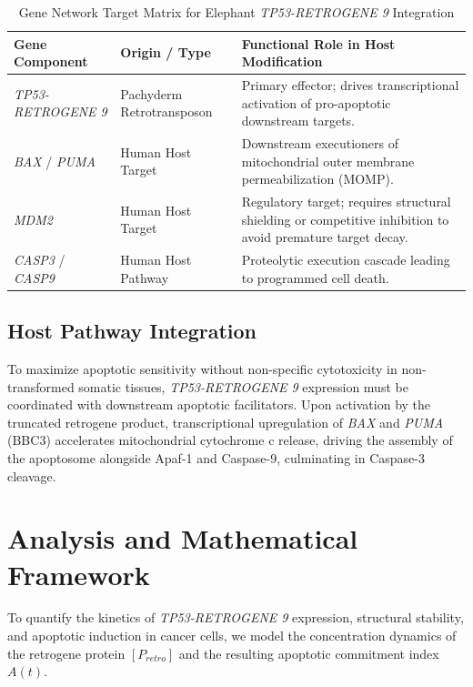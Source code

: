 \documentclass[12pt]{article}
\begin{document}
\begin{table}[h!]
\centering
\caption{Gene Network Target Matrix for Elephant \textit{TP53-RETROGENE 9} Integration}
\vspace{0.2cm}
\begin{tabular}{|l|l|p{6cm}|}
\hline
\textbf{Gene Component} & \textbf{Origin / Type} & \textbf{Functional Role in Host Modification} \\ \hline
\textit{TP53-RETROGENE 9} & Pachyderm Retrotransposon & Primary effector; drives transcriptional activation of pro-apoptotic downstream targets. \\ \hline
\textit{BAX} / \textit{PUMA} & Human Host Target & Downstream executioners of mitochondrial outer membrane permeabilization (MOMP). \\ \hline
\textit{MDM2} & Human Host Target & Regulatory target; requires structural shielding or competitive inhibition to avoid premature target decay. \\ \hline
\textit{CASP3} / \textit{CASP9} & Human Host Pathway & Proteolytic execution cascade leading to programmed cell death. \\ \hline
\end{tabular}
\end{table}

\subsection{Host Pathway Integration}

To maximize apoptotic sensitivity without non-specific cytotoxicity in non-transformed somatic tissues, \textit{TP53-RETROGENE 9} expression must be coordinated with downstream apoptotic facilitators. Upon activation by the truncated retrogene product, transcriptional upregulation of \textit{BAX} and \textit{PUMA} (BBC3) accelerates mitochondrial cytochrome c release, driving the assembly of the apoptosome alongside Apaf-1 and Caspase-9, culminating in Caspase-3 cleavage.

\section{Analysis and Mathematical Framework}

To quantify the kinetics of \textit{TP53-RETROGENE 9} expression, structural stability, and apoptotic induction in cancer cells, we model the concentration dynamics of the retrogene protein $[P_{retro}]$ and the resulting apoptotic commitment index $A(t)$.
\end{document}

